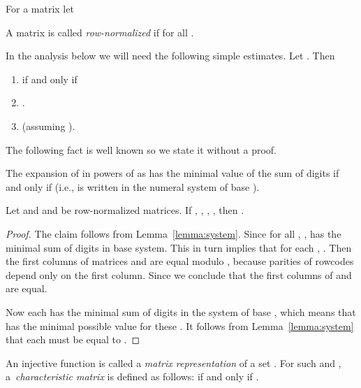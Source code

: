 \begin{definition}
For a matrix  let

\end{definition}

\begin{definition}
A matrix  is called \emph{row-normalized} if  for all .
\end{definition}
\begin{remark}
In the analysis below we will need the following simple estimates. Let . Then
\begin{enumerate}
\item  if and only if 
\item .
\item  (assuming ).
\end{enumerate}
\end{remark}

The following fact is well known so we state it without a proof.

\begin{lemma}
\label{lemma:system}
The expansion of  in powers of  as  has the minimal value of the sum of digits  if and only if  (i.e.,  is written in the numeral system of base ).
\end{lemma}


\begin{lemma}
\label{lemma:coding}
Let  and 
and  be row-normalized matrices.
If
, 
,
,
,
then .
\end{lemma}

\begin{proof}
The claim follows from Lemma~\ref{lemma:system}.
Since for all , ,  has the minimal sum of digits in base  system. This in turn implies that for each , . Then the first columns of matrices  and  are equal modulo , because parities of rowcodes depend only on the first column. Since  we conclude that the first columns of  and  are equal.

Now each  has the minimal sum of digits in the system of base , which means that  has the minimal possible value for these . It follows from Lemma~\ref{lemma:system} that each  must be equal to .
\end{proof}

\begin{definition} 
An injective function  is called a \emph{matrix representation} of a set . For such  and , a~\emph{characteristic matrix}  is defined as follows:  if and only if .
\end{definition}


